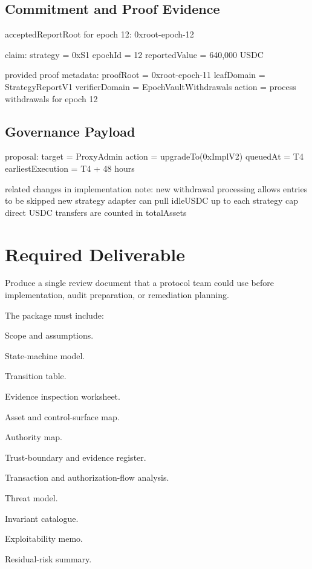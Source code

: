 \subsection*{Commitment and Proof Evidence}

\begin{codeblock}
acceptedReportRoot for epoch 12:
    0xroot-epoch-12

claim:
    strategy = 0xS1
    epochId = 12
    reportedValue = 640,000 USDC

provided proof metadata:
    proofRoot = 0xroot-epoch-11
    leafDomain = StrategyReportV1
    verifierDomain = EpochVaultWithdrawals
    action = process withdrawals for epoch 12
\end{codeblock}

\subsection*{Governance Payload}

\begin{codeblock}
proposal:
    target = ProxyAdmin
    action = upgradeTo(0xImplV2)
    queuedAt = T4
    earliestExecution = T4 + 48 hours

related changes in implementation note:
    new withdrawal processing allows entries to be skipped
    new strategy adapter can pull idleUSDC up to each strategy cap
    direct USDC transfers are counted in totalAssets
\end{codeblock}

\section*{Required Deliverable}

\begin{artifactbox}
Produce a single review document that a protocol team could use before implementation, audit preparation, or remediation planning.
\end{artifactbox}

The package must include:

\begin{artifactchecklist}
\item Scope and assumptions.
\item State-machine model.
\item Transition table.
\item Evidence inspection worksheet.
\item Asset and control-surface map.
\item Authority map.
\item Trust-boundary and evidence register.
\item Transaction and authorization-flow analysis.
\item Threat model.
\item Invariant catalogue.
\item Exploitability memo.
\item Residual-risk summary.
\end{artifactchecklist}

